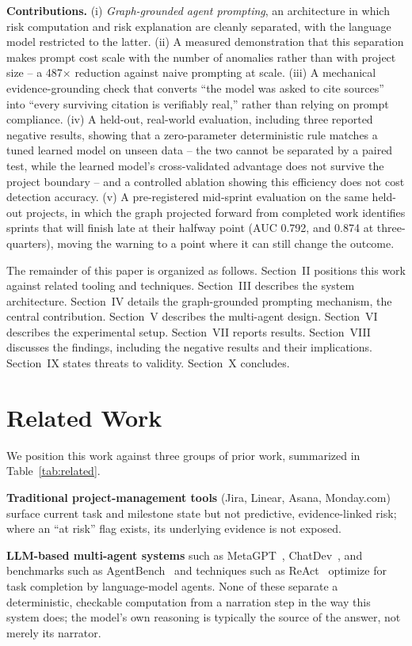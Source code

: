 \documentclass[conference]{IEEEtran}
\begin{document}
\textbf{Contributions.} (i) \emph{Graph-grounded agent prompting}, an architecture in
which risk computation and risk explanation are cleanly separated, with the language
model restricted to the latter. (ii) A measured demonstration that this separation
makes prompt cost scale with the number of anomalies rather than with project size --
a 487$\times$ reduction against naive prompting at scale. (iii) A mechanical
evidence-grounding check that converts ``the model was asked to cite sources'' into
``every surviving citation is verifiably real,'' rather than relying on prompt
compliance. (iv) A held-out, real-world evaluation, including three reported negative
results, showing that a zero-parameter deterministic rule matches a tuned learned
model on unseen data -- the two cannot be separated by a paired test, while the
learned model's cross-validated advantage does not survive the project boundary -- and
a controlled ablation showing this efficiency does not cost detection accuracy.
(v) A pre-registered mid-sprint evaluation on the same held-out projects, in which the
graph projected forward from completed work identifies sprints that will finish late at
their halfway point (AUC 0.792, and 0.874 at three-quarters), moving the warning to a
point where it can still change the outcome.

The remainder of this paper is organized as follows. Section~II positions this work
against related tooling and techniques. Section~III describes the system
architecture. Section~IV details the graph-grounded prompting mechanism, the central
contribution. Section~V describes the multi-agent design. Section~VI describes the
experimental setup. Section~VII reports results. Section~VIII discusses the findings,
including the negative results and their implications. Section~IX states threats to
validity. Section~X concludes.

\section{Related Work}

We position this work against three groups of prior work, summarized in
Table~\ref{tab:related}.

\textbf{Traditional project-management tools} (Jira, Linear, Asana, Monday.com)
surface current task and milestone state but not predictive, evidence-linked risk;
where an ``at risk'' flag exists, its underlying evidence is not exposed.

\textbf{LLM-based multi-agent systems} such as MetaGPT~\cite{metagpt},
ChatDev~\cite{chatdev}, and benchmarks such as AgentBench~\cite{agentbench} and
techniques such as ReAct~\cite{react} optimize for task completion by language-model
agents. None of these separate a deterministic, checkable computation from a
narration step in the way this system does; the model's own reasoning is typically
the source of the answer, not merely its narrator.
\end{document}

